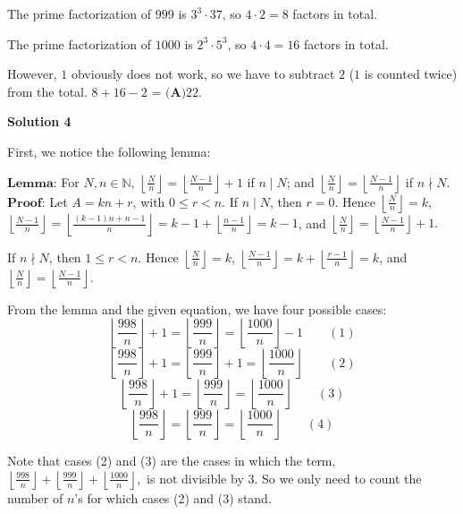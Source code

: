 \begin{enumerate}
 The prime factorization of $999$ is $3^3\cdot37$, so $4\cdot2=8$ factors in total.

 The prime factorization of $1000$ is $2^3\cdot5^3$, so $4\cdot4=16$ factors in total.

 However, $1$ obviously does not work, so we have to subtract $2$ ($1$ is counted twice) from the total. $8 + 16 - 2$ = $\boxed{\textbf{(A)}22}$.

 



\textbf{Solution 4}

First, we notice the following lemma:

 $\textbf{Lemma}$: For $N, n \in \mathbb{N}$, $\left\lfloor \frac{N}{n} \right\rfloor = \left\lfloor \frac{N-1}{n} \right\rfloor + 1$ if $n \mid N$; and $\left\lfloor \frac{N}{n} \right\rfloor = \left\lfloor \frac{N-1}{n} \right\rfloor$  if $n \nmid N.$
$\textbf{Proof}$: Let $A = kn + r$, with $0 \leq r < n$. If $n \mid N$, then $r = 0$. Hence $\left\lfloor \frac{N}{n} \right\rfloor = k$, $\left\lfloor \frac{N-1}{n} \right\rfloor = \left\lfloor \frac{(k-1)n+n-1}{n} \right\rfloor = k-1 + \left\lfloor \frac{n-1}{n} \right\rfloor = k-1$, and $\left\lfloor \frac{N}{n} \right\rfloor = \left\lfloor \frac{N-1}{n} \right\rfloor + 1.$

 If $n \nmid N$, then $1 \leq r < n$. Hence $\left\lfloor \frac{N}{n} \right\rfloor = k$, $\left\lfloor \frac{N-1}{n} \right\rfloor = k + \left\lfloor \frac{r-1}{n} \right\rfloor = k$, and $\left\lfloor \frac{N}{n} \right\rfloor = \left\lfloor \frac{N-1}{n} \right\rfloor.$

 From the lemma and the given equation, we have four possible cases:
 \[\left\lfloor \frac{998}{n} \right\rfloor + 1 = \left\lfloor \frac{999}{n} \right\rfloor = \left\lfloor \frac{1000}{n} \right\rfloor - 1 \qquad (1)\]
 \[\left\lfloor \frac{998}{n} \right\rfloor + 1 = \left\lfloor \frac{999}{n} \right\rfloor + 1 = \left\lfloor \frac{1000}{n} \right\rfloor \qquad (2)\]
 \[\left\lfloor \frac{998}{n} \right\rfloor + 1 = \left\lfloor \frac{999}{n} \right\rfloor = \left\lfloor \frac{1000}{n} \right\rfloor \qquad (3)\]
 \[\left\lfloor \frac{998}{n} \right\rfloor = \left\lfloor \frac{999}{n} \right\rfloor = \left\lfloor \frac{1000}{n} \right\rfloor \qquad (4)\]

 Note that cases (2) and (3) are the cases in which the term, $\left\lfloor \frac{998}{n} \right\rfloor + \left\lfloor \frac{999}{n} \right\rfloor + \left\lfloor \frac{1000}{n} \right\rfloor,$ is not divisible by $3$. So we only need to count the number of $n$'s for which cases (2) and (3) stand.


\end{enumerate}
